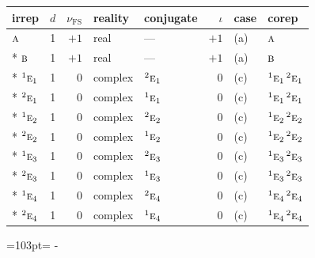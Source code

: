 \documentclass[10pt,a4paper]{article}
\newcommand{\needspace}[1]{\par\penalty-100\begingroup\dimen0=#1\relax\dimen2=\pagegoal
  \advance\dimen2-\pagetotal\ifdim\dimen0>\dimen2\relax\ifdim\dimen2>0pt\vfil\break\fi\fi
  \endgroup}
\numberwithin{equation}{section}
\newcommand{\irr}[1]{\text{\normalfont\scshape #1}}
\newcommand{\conjpair}[1]{{}^{#1}}
\newcommand{\fsind}{\nu_{\mathrm{FS}}}
\begin{document}
{\small\renewcommand{\arraystretch}{1.25}\setlength{\tabcolsep}{4pt}\begin{longtable}{@{}lrrllrll@{}}\toprule
irrep & $d$ & $\fsind$ & reality & conjugate & $\iota$ & case & corep\\\midrule\endhead
\bottomrule\endfoot\endlastfoot
$\irr{a}$ & 1 & $+1$ & real & --- & $+1$ & (a) & $\irr{a}$\\*
$\irr{b}$ & 1 & $+1$ & real & --- & $+1$ & (a) & $\irr{b}$\\*
$\conjpair{1}\irr{e}_{1}$ & 1 & $0$ & complex & $\conjpair{2}\irr{e}_{1}$ & $0$ & (c) & $\conjpair{1}\irr{e}_{1}\,\conjpair{2}\irr{e}_{1}$\\*
$\conjpair{2}\irr{e}_{1}$ & 1 & $0$ & complex & $\conjpair{1}\irr{e}_{1}$ & $0$ & (c) & $\conjpair{1}\irr{e}_{1}\,\conjpair{2}\irr{e}_{1}$\\*
$\conjpair{1}\irr{e}_{2}$ & 1 & $0$ & complex & $\conjpair{2}\irr{e}_{2}$ & $0$ & (c) & $\conjpair{1}\irr{e}_{2}\,\conjpair{2}\irr{e}_{2}$\\*
$\conjpair{2}\irr{e}_{2}$ & 1 & $0$ & complex & $\conjpair{1}\irr{e}_{2}$ & $0$ & (c) & $\conjpair{1}\irr{e}_{2}\,\conjpair{2}\irr{e}_{2}$\\*
$\conjpair{1}\irr{e}_{3}$ & 1 & $0$ & complex & $\conjpair{2}\irr{e}_{3}$ & $0$ & (c) & $\conjpair{1}\irr{e}_{3}\,\conjpair{2}\irr{e}_{3}$\\*
$\conjpair{2}\irr{e}_{3}$ & 1 & $0$ & complex & $\conjpair{1}\irr{e}_{3}$ & $0$ & (c) & $\conjpair{1}\irr{e}_{3}\,\conjpair{2}\irr{e}_{3}$\\*
$\conjpair{1}\irr{e}_{4}$ & 1 & $0$ & complex & $\conjpair{2}\irr{e}_{4}$ & $0$ & (c) & $\conjpair{1}\irr{e}_{4}\,\conjpair{2}\irr{e}_{4}$\\*
$\conjpair{2}\irr{e}_{4}$ & 1 & $0$ & complex & $\conjpair{1}\irr{e}_{4}$ & $0$ & (c) & $\conjpair{1}\irr{e}_{4}\,\conjpair{2}\irr{e}_{4}$\\
\bottomrule\end{longtable}}
\needspace{103pt}
\end{document}
